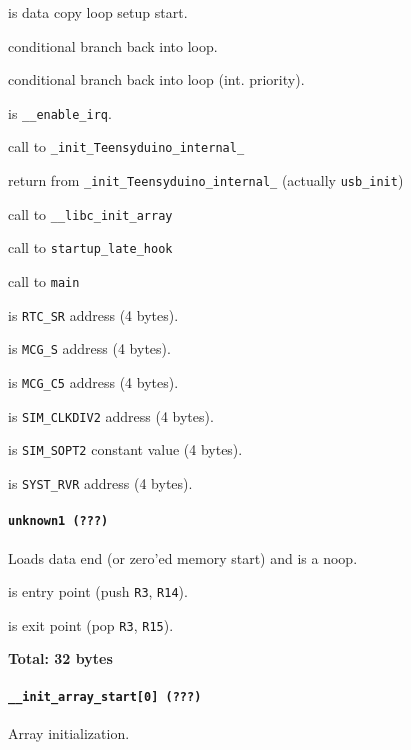 \vspace{1em}

 is data copy loop setup start.

 conditional branch back into loop.

\vspace{1em}

 conditional branch back into loop (int. priority).

\vspace{1em}

 is \texttt{\_\_enable\_irq}.

 call to \texttt{\_init\_Teensyduino\_internal\_}

 return from \texttt{\_init\_Teensyduino\_internal\_} (actually \texttt{usb\_init})

 call to \texttt{\_\_libc\_init\_array}

 call to \texttt{startup\_late\_hook}

 call to \texttt{main}

\vspace{1em}

 is \texttt{RTC\_SR} address (4 bytes).

 is \texttt{MCG\_S} address (4 bytes).

 is \texttt{MCG\_C5} address (4 bytes).

 is \texttt{SIM\_CLKDIV2} address (4 bytes).

 is \texttt{SIM\_SOPT2} constant value (4 bytes).

 is \texttt{SYST\_RVR} address (4 bytes).

\paragraph{\texttt{unknown1 (???)}} Loads data end (or zero'ed memory start) and
is a noop.

 is entry point (push \texttt{R3}, \texttt{R14}).

 is exit point (pop \texttt{R3}, \texttt{R15}).

\textbf{Total: 32 bytes}

\paragraph{\texttt{\_\_init\_array\_start[0] (???)}} Array initialization.

